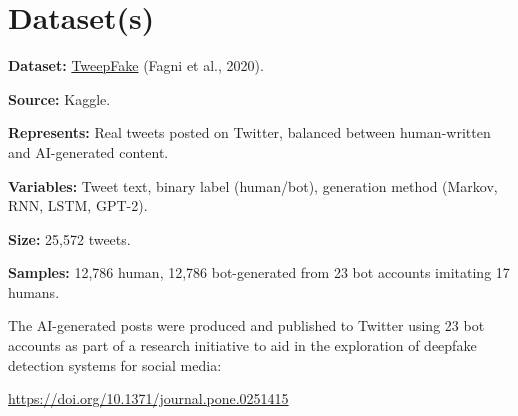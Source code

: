 \section*{Dataset(s)}



\textbf{Dataset:} \href{https://www.kaggle.com/datasets/mtesconi/twitter-deep-fake-text}{TweepFake} (Fagni et al., 2020). 

\textbf{Source:} Kaggle. 

\textbf{Represents:} Real tweets posted on Twitter, balanced between human-written and AI-generated content. 

\textbf{Variables:} Tweet text, binary label (human/bot), generation method (Markov, RNN, LSTM, GPT-2). 

\textbf{Size:} 25,572 tweets. 

\textbf{Samples:} 12,786 human, 12,786 bot-generated from 23 bot accounts imitating 17 humans.

The AI-generated posts were produced and published to Twitter using 23 bot accounts as part of a research initiative to aid in the exploration of deepfake detection systems for social media: 

\href{https://doi.org/10.1371/journal.pone.0251415}{https://doi.org/10.1371/journal.pone.0251415}

\vspace{0.5cm}

